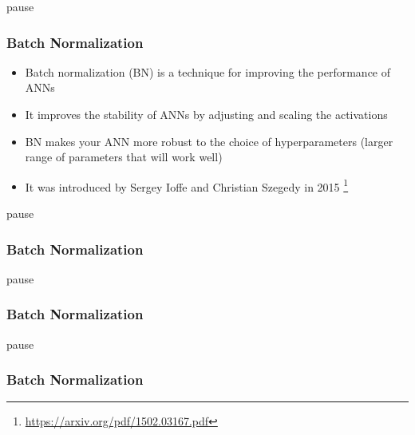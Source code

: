 \begin{frame}[fragile]{pause}\frametitle{Batch Normalization}
\begin{itemize}
\item Batch normalization (BN) is a technique for improving the performance of ANNs
\item It improves the stability of ANNs by adjusting and scaling the activations
\item BN makes your ANN more robust to the choice of hyperparameters (larger range of parameters that will work well)
\item It was introduced by Sergey Ioffe and Christian Szegedy in 2015 \footnote{\url{https://arxiv.org/pdf/1502.03167.pdf}}
\end{itemize}
\end{frame}

\begin{frame}[fragile]{pause}\frametitle{Batch Normalization}
\end{frame}

\begin{frame}[fragile]{pause}\frametitle{Batch Normalization}
\end{frame}

\begin{frame}[fragile]{pause}\frametitle{Batch Normalization}
\end{frame}




